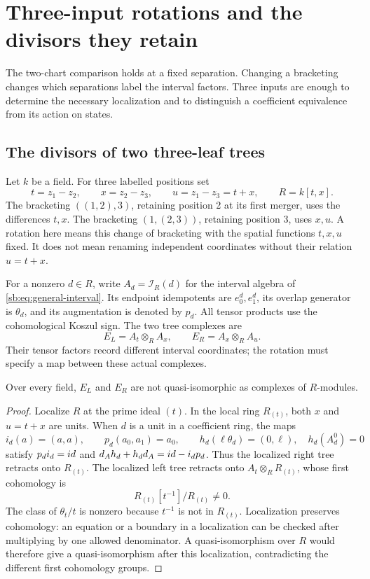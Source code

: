 \section{Three-input rotations and the divisors they retain}
\label{sec:three-leaf-rotations}

The two-chart comparison holds at a fixed separation.  Changing a
bracketing changes which separations label the interval factors.
Three inputs are enough to determine the necessary localization and
to distinguish a coefficient equivalence from its action on states.

\subsection{The divisors of two three-leaf trees}

Let \(k\) be a field.  For three labelled positions set
\[
 t=z_1-z_2,\qquad x=z_2-z_3,\qquad u=z_1-z_3=t+x,
 \qquad R=k[t,x].
\]
The bracketing \(((1,2),3)\), retaining position 2 at its first
merger, uses the differences \(t,x\).  The bracketing
\((1,(2,3))\), retaining position 3, uses \(x,u\).
A rotation here means this change of bracketing with the spatial
functions \(t,x,u\) fixed.  It does not mean renaming independent
coordinates without their relation \(u=t+x\).

For a nonzero \(d\in R\), write \(A_d=\mathcal I_R(d)\)
for the interval algebra of \eqref{sb:eq:general-interval}.
Its endpoint idempotents are \(e_0^d,e_1^d\), its overlap generator
is \(\theta_d\), and its augmentation is denoted by \(p_d\).
All tensor products use the cohomological Koszul sign.
The two tree complexes are
\[
 E_L=A_t\otimes_R A_x,\qquad
 E_R=A_x\otimes_R A_u.
\]
Their tensor factors record different interval coordinates; the
rotation must specify a map between these actual complexes.

\begin{proposition}
\label{tr:prop:global-obstruction}
Over every field, \(E_L\) and \(E_R\) are not
quasi-isomorphic as complexes of \(R\)-modules.
\end{proposition}

\begin{proof}
Localize \(R\) at the prime ideal \((t)\).  In the local ring
\(R_{(t)}\), both \(x\) and \(u=t+x\) are units.
When \(d\) is a unit in a coefficient ring, the maps
\[
 i_d(a)=(a,a),\qquad p_d(a_0,a_1)=a_0,\qquad
 h_d(\ell\theta_d)=(0,\ell),\quad h_d(A_d^0)=0
\]
satisfy \(p_di_d=id\) and
\(d_Ah_d+h_dd_A=id-i_dp_d\).  Thus the localized right
tree retracts onto \(R_{(t)}\).  The localized left tree
retracts onto \(A_t\otimes_R R_{(t)}\), whose first
cohomology is
\[
 R_{(t)}[t^{-1}]/R_{(t)}\ne0.
\]
The class of \(\theta_t/t\) is nonzero because \(t^{-1}\)
is not in \(R_{(t)}\).  Localization preserves cohomology:
an equation or a boundary in a localization can be checked after
multiplying by one allowed denominator.  A quasi-isomorphism over
\(R\) would therefore give a quasi-isomorphism after this
localization, contradicting the different first cohomology groups.
\end{proof}

